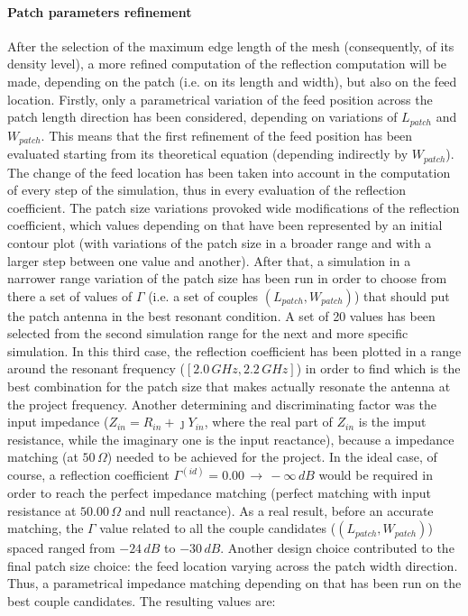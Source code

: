\documentclass[12pt,a4paper]{article}
\begin{document}
{	\paragraph{\selectfont\color{Turquoise}Patch parameters refinement}
	After the selection of the maximum edge length of the mesh (consequently, of its density level), a more refined computation of the reflection computation will be made, depending on the patch (i.e. on its length and width), but also on the feed location. Firstly, only a parametrical variation of the feed position across the patch length direction has been considered, depending on variations of $L_{patch}$ and $W_{patch}$. This means that the first refinement of the feed position has been evaluated starting from its theoretical equation (depending indirectly by $W_{patch}$). The change of the feed location has been taken into account in the computation of every step of the simulation, thus in every evaluation of the reflection coefficient. The patch size variations provoked wide modifications of the reflection coefficient, which values depending on that have been represented by an initial contour plot (with variations of the patch size in a broader range and with a larger step between one value and another). After that, a simulation in a narrower range variation of the patch size has been run in order to choose from there a set of values of $\Gamma$ (i.e. a set of couples $(L_{patch},W_{patch})$) that should put the patch antenna in the best resonant condition. A set of 20 values has been selected from the second simulation range for the next and more specific simulation. In this third case, the reflection coefficient has been plotted in a range around the resonant frequency ($[2.0\,GHz, 2.2\,GHz]$) in order to find which is the best combination for the patch size that makes actually resonate the antenna at the project frequency. Another determining and discriminating factor was the input impedance ($Z_{in}=R_{in}+\jmath Y_{in}$, where the real part of $Z_{in}$ is the imput resistance, while the imaginary one is the input reactance), because a impedance matching (at $50\,\Omega$) needed to be achieved for the project. In the ideal case, of course, a reflection coefficient $\Gamma^{(id)}=0.00\,\to\,-\infty\,dB$ would be required in order to reach the perfect impedance matching (perfect matching with input resistance at $50.00\,\Omega$ and null reactance). As a real result, before an accurate matching, the $\Gamma$ value related to all the couple candidates ($(L_{patch},W_{patch})$) spaced ranged from $-24\,dB$ to $-30\,dB$. Another design choice contributed to the final patch size choice: the feed location varying across the patch width direction. Thus, a parametrical impedance matching depending on that has been run on the best couple candidates. The resulting values are:
}
\end{document}
